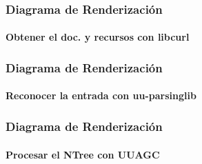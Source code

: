 \documentclass[12pt]{beamer}
\begin{document}
\begin{frame}
\frametitle{Diagrama de Renderización}
\framesubtitle{Obtener el doc. y recursos con libcurl}
\end{frame}

\begin{frame}
\frametitle{Diagrama de Renderización}
\framesubtitle{Reconocer la entrada con uu-parsinglib}
\end{frame}

\begin{frame}
\frametitle{Diagrama de Renderización}
\framesubtitle{Procesar el NTree con UUAGC}
\end{frame}
\end{document}
